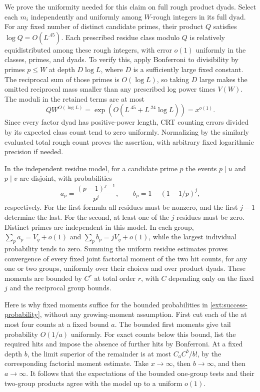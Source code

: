 We prove the uniformity needed for this claim on full rough
product dyads.  Select each $m_i$ independently and uniformly
among $W$-rough integers in its full dyad.  For any fixed number
of distinct candidate primes, their product $Q$ satisfies
$\log Q=O(L^{.45})$.  Each prescribed residue class modulo $Q$
is relatively equidistributed among these rough integers, with
error $o(1)$ uniformly in the classes, primes, and dyads.
To verify this, apply Bonferroni to divisibility by primes
$p\leq W$ at depth $D\log L$, where $D$ is a sufficiently
large fixed constant.  The reciprocal sum of those primes is
$O(\log L)$, so taking $D$ large makes the omitted reciprocal
mass smaller than any prescribed log power times $V(W)$.
The moduli in the retained terms are at most
\[
 QW^{O(\log L)}
 =\exp(O(L^{.45}+L^{.24}\log L))=x^{o(1)}.
\]
Since every factor dyad has positive-power length, CRT counting
errors divided by its expected class count tend to zero
uniformly.  Normalizing by the similarly evaluated total rough
count proves the assertion, with arbitrary fixed logarithmic
precision if needed.

In the independent residue model, for a candidate prime $p$ the
events $p\mid u$ and $p\mid v$ are disjoint, with probabilities
\begin{equation}\label{ext:prime-event-probabilities}
 a_p=\frac{(p-1)^{j-1}}{p^j},\qquad
 b_p=1-(1-1/p)^j,
\end{equation}
respectively.  For the first formula all residues must be
nonzero, and the first $j-1$ determine the last.  For the second,
at least one of the $j$ residues must be zero.  Distinct primes
are independent in this model.  In each group,
$\sum_pa_p=V_g+o(1)$ and $\sum_pb_p=jV_g+o(1)$, while the
largest individual probability tends to zero.  Summing the
uniform residue estimates proves convergence of every fixed
joint factorial moment of the two hit counts, for any one or
two groups, uniformly over their choices and over product dyads.
These moments are bounded by $C^r$ at total order $r$, with $C$
depending only on the fixed $j$ and the reciprocal group bounds.

Here is why fixed moments suffice for the bounded probabilities
in \eqref{ext:success-probability}, without any growing-moment
assumption.  First cut each of the at most four counts at a
fixed bound $a$.  The bounded first moments give tail probability
$O(1/a)$ uniformly.  For exact counts below this bound, list the
required hits and impose the absence of further hits by
Bonferroni.  At a fixed depth $b$, the limit superior of the
remainder is at most $C_a C^b/b!$, by the corresponding
factorial moment estimate.  Take $x\to\infty$, then
$b\to\infty$, and then $a\to\infty$.  It follows that the
expectations of the bounded one-group tests and their two-group
products agree with the model up to a uniform $o(1)$.


